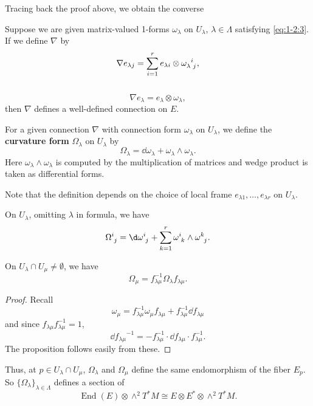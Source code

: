 \documentclass[12pt]{article}
\begin{document}
Tracing back the proof above, we obtain the converse
\begin{prop}
    Suppose we are given matrix-valued 1-forms \(\omega_\lambda\) on
    \(U_\lambda\), \(\lambda\in \Lambda\) satisfying \cref{eq:1-2:3}.
    If we define \(\nabla\) by \[
        \nabla e_{\lambda j}=\sum_{i=1}^{r} e_{\lambda i}\otimes 
        \tensor{\omega}{_\lambda^i_j}
    ,\] \ie\ \[
        \nabla e_\lambda=e_\lambda\otimes\omega_\lambda
    ,\] then \(\nabla\) defines a well-defined connection on \(E\).
\end{prop}

\begin{definition}
    For a given connection \(\nabla\) with connection form \(\omega
    _\lambda\) on \(U_\lambda\), we define the \textbf{curvature form}
    \(\Omega_\lambda\) on \(U_\lambda\) by \[
        \Omega_\lambda=\dd{\omega_\lambda}+\omega_\lambda\wedge
        \omega_\lambda
    .\] Here \(\omega_\lambda\wedge \omega_\lambda\) is computed by the
    multiplication of matrices and wedge product is taken as differential
    forms.
\end{definition}
Note that the definition depends on the choice of local frame
\(e_{\lambda 1},\ldots,e_{\lambda r}\) on \(U_\lambda\).

On \(U_\lambda\), omitting \(\lambda\) in formula, we have \[
    \tensor{\Omega}{^i_j}=\dd{\tensor{\omega}{^i_j}}
    +\sum_{k=1}^{r}\tensor{\omega}{^i_k}\wedge \tensor{\omega}{^k_j}
.\] 

\begin{prop}
    On \(U_\lambda\cap U_\mu\neq \emptyset\), we have \[
        \Omega_\mu=f_{\lambda\mu}^{-1}\Omega_{\lambda}f_{\lambda\mu}
    .\] 
\end{prop}
\begin{proof}
    Recall \[
        \omega_\mu=f_{\lambda\mu}^{-1}\omega_\mu f_{\lambda\mu}
        +f_{\lambda\mu}^{-1}\dd{f_{\lambda\mu}}
    \] and since \(f_{\lambda\mu}f_{\lambda\mu}^{-1}=1\), \[
        \dd{f_{\lambda\mu}}^{-1}=-f_{\lambda\mu}^{-1}\cdot
        \dd{f_{\lambda\mu}}\cdot f_{\lambda\mu}^{-1}
    .\] The proposition follows easily from these.
\end{proof}

Thus, at \(p\in U_\lambda\cap U_\mu\), \(\Omega_\lambda\) and
\(\Omega_\mu\) define the same endomorphism of the fiber \(E_p\).
So \(\{\Omega_\lambda\}_{\lambda\in \Lambda}\) defines a section of \[
    \operatorname{End}(E)\otimes \wedge^2T^*M\cong E\otimes E^*\otimes 
    \wedge^2T^*M
.\] 
\end{document}
